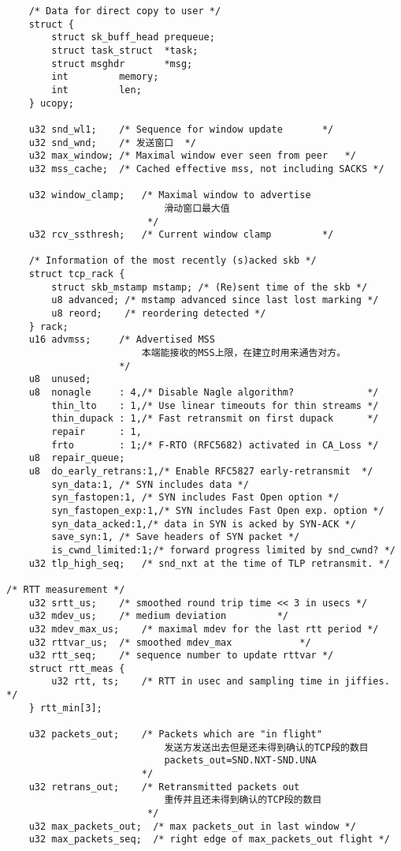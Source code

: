 \begin{verbatim}
    /* Data for direct copy to user */
    struct {
        struct sk_buff_head prequeue;
        struct task_struct  *task;
        struct msghdr       *msg;
        int         memory;
        int         len;
    } ucopy;

    u32 snd_wl1;    /* Sequence for window update       */
    u32 snd_wnd;    /* 发送窗口  */
    u32 max_window; /* Maximal window ever seen from peer   */
    u32 mss_cache;  /* Cached effective mss, not including SACKS */

    u32 window_clamp;   /* Maximal window to advertise     
                            滑动窗口最大值                     
                         */
    u32 rcv_ssthresh;   /* Current window clamp         */

    /* Information of the most recently (s)acked skb */
    struct tcp_rack {
        struct skb_mstamp mstamp; /* (Re)sent time of the skb */
        u8 advanced; /* mstamp advanced since last lost marking */
        u8 reord;    /* reordering detected */
    } rack;
    u16 advmss;     /* Advertised MSS           
                        本端能接收的MSS上限，在建立时用来通告对方。                 
                    */
    u8  unused;
    u8  nonagle     : 4,/* Disable Nagle algorithm?             */
        thin_lto    : 1,/* Use linear timeouts for thin streams */
        thin_dupack : 1,/* Fast retransmit on first dupack      */
        repair      : 1,
        frto        : 1;/* F-RTO (RFC5682) activated in CA_Loss */
    u8  repair_queue;
    u8  do_early_retrans:1,/* Enable RFC5827 early-retransmit  */
        syn_data:1, /* SYN includes data */
        syn_fastopen:1, /* SYN includes Fast Open option */
        syn_fastopen_exp:1,/* SYN includes Fast Open exp. option */
        syn_data_acked:1,/* data in SYN is acked by SYN-ACK */
        save_syn:1, /* Save headers of SYN packet */
        is_cwnd_limited:1;/* forward progress limited by snd_cwnd? */
    u32 tlp_high_seq;   /* snd_nxt at the time of TLP retransmit. */

/* RTT measurement */
    u32 srtt_us;    /* smoothed round trip time << 3 in usecs */
    u32 mdev_us;    /* medium deviation         */
    u32 mdev_max_us;    /* maximal mdev for the last rtt period */
    u32 rttvar_us;  /* smoothed mdev_max            */
    u32 rtt_seq;    /* sequence number to update rttvar */
    struct rtt_meas {
        u32 rtt, ts;    /* RTT in usec and sampling time in jiffies. */
    } rtt_min[3];

    u32 packets_out;    /* Packets which are "in flight"    
                            发送方发送出去但是还未得到确认的TCP段的数目
                            packets_out=SND.NXT-SND.UNA             
                        */
    u32 retrans_out;    /* Retransmitted packets out       
                            重传并且还未得到确认的TCP段的数目
                         */
    u32 max_packets_out;  /* max packets_out in last window */
    u32 max_packets_seq;  /* right edge of max_packets_out flight */


\end{verbatim}
